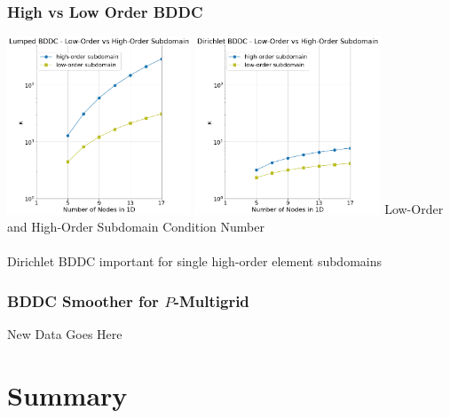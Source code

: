 \documentclass{beamer}
\begin{document}
\begin{frame}
\begin{center}
\frametitle{High vs Low Order BDDC}

\includegraphics[height=5.3cm]{../img/lowVsHighLumped_tall}
\hspace{0.3cm}
\includegraphics[height=5.3cm]{../img/lowVsHighDirichlet_tall}
{\small Low-Order and High-Order Subdomain Condition Number}\\

~\\

Dirichlet BDDC important for single high-order element subdomains

\end{center}
\end{frame}


\begin{frame}
\begin{center}
\frametitle{BDDC Smoother for $P$-Multigrid}

New Data Goes Here\\

\end{center}
\end{frame}

\section{Summary}
\end{document}

